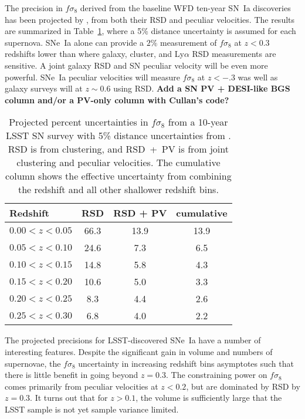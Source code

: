 \documentclass{aastex62}   	%
\begin{document}
The precision in  $f\sigma_8$ derived from the baseline WFD ten-year SN~Ia discoveries has been projected by \citet{2017ApJ...847..128H},
from both their RSD and peculiar velocities.
The results are summarized in Table~\ref{tab:howlett}, where a 5\% distance uncertainty is assumed for each supernova.
SNe~Ia alone can provide a $2\%$ measurement of $f\sigma_8$ at $z<0.3$ redshifts lower than where galaxy, cluster, and Ly$\alpha$
RSD measurements are sensitive.  A joint galaxy RSD and SN peculiar velocity will be even more powerful.
SNe~Ia peculiar velocities will measure $f\sigma_8$ at $z<-.3$  was well as galaxy surveys will at $z \sim 0.6$ using RSD. 
{\bf Add a SN PV + DESI-like BGS column and/or a PV-only column with Cullan's code? }
\begin{table}
   \centering
   \begin{tabular}{@{} lccc @{}} %
	\hline
	Redshift & RSD & RSD + PV & cumulative\\ \hline
      $0.00<z<0.05$   & 66.3 & 13.9 & 13.9\\
     $0.05<z<0.10$            & 24.6     &  7.3 & 6.5\\
     $0.10<z<0.15$      & 14.8  & 5.8 & 4.3\\
     $0.15<z<0.20$      & 10.6  & 5.0 & 3.3\\
      $0.20<z<0.25$     & 8.3  & 4.4 & 2.6\\
     $0.25<z<0.30$  & 6.8  &  4.0 & 2.2\\
      \hline
   \end{tabular}
   \caption{Projected percent uncertainties in $f\sigma_8$ from a 10-year LSST SN survey with 5\% distance uncertainties from
   \citet{2017ApJ...847..128H}. RSD is from clustering, and RSD~+~PV is from joint clustering and peculiar velocities.
   The cumulative column shows the effective uncertainty from combining the redshift and all other shallower redshift bins.}
   \label{tab:howlett}
\end{table}

The projected precisions for LSST-discovered SNe~Ia have a number of interesting features. 
Despite the significant gain in volume and numbers of supernovae, the $f\sigma_8$ uncertainty in increasing redshift bins asymptotes such that 
there is little benefit in going beyond
$z=0.3$.
The constraining power on  $f\sigma_8$ 
comes primarily from peculiar velocities
at $z<0.2$, but are dominated by RSD by $z=0.3$.
It turns out that for $z>0.1$, the volume is sufficiently large that the LSST sample is not yet sample variance limited.
\end{document}
